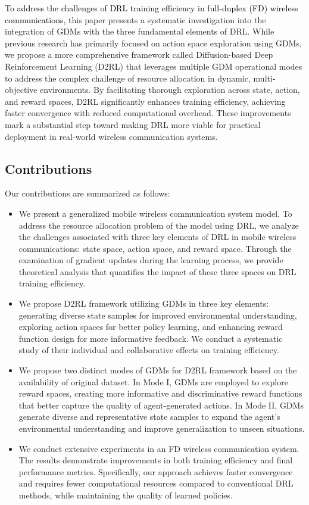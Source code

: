 \documentclass[comsoc,journal]{IEEEtran}
\begin{document}
\textcolor{black}{To address the challenges of DRL training efficiency in full-duplex (FD) wireless communications, }this paper presents a systematic investigation into the integration of GDMs with the three fundamental elements of DRL. While previous research has primarily focused on action space exploration using GDMs, we propose a more comprehensive framework called Diffusion-based Deep Reinforcement Learning (D2RL) that leverages multiple GDM operational modes to address the complex challenge of resource allocation in dynamic, multi-objective environments. By facilitating thorough exploration across state, action, and reward spaces, D2RL significantly enhances training efficiency, achieving faster convergence with reduced computational overhead. These improvements mark a substantial step toward making DRL more viable for practical deployment in real-world wireless communication systems.
\vspace{-8pt}
\subsection{Contributions}
Our contributions are summarized as follows:
\begin{itemize}
\item We present a generalized mobile wireless communication system model. To address the resource allocation problem of the model using DRL, we analyze the challenges associated with three key elements of DRL in mobile wireless communications: state space, action space, and reward space. Through the examination of gradient updates during the learning process, we provide theoretical analysis that quantifies the impact of these three spaces on DRL training efficiency.
\item  We propose D2RL framework utilizing GDMs in three key elements: generating diverse state samples for improved environmental understanding, exploring action spaces for better policy learning, and enhancing reward function design for more informative feedback. We conduct a systematic study of their individual and collaborative effects on training efficiency.
\item We propose two distinct modes of GDMs for D2RL framework based on the availability of original dataset. In Mode I, GDMs are employed to explore reward spaces, creating more informative and discriminative reward functions that better capture the quality of agent-generated actions. In Mode II, GDMs generate diverse and representative state samples to expand the agent's environmental understanding and improve generalization to unseen situations.
\item We conduct extensive experiments in an FD wireless communication system. The results demonstrate improvements in both training efficiency and final performance metrics. Specifically, our approach achieves faster convergence and requires fewer computational resources compared to conventional DRL methods, while maintaining the quality of learned policies.
\end{itemize}
\vspace{-8pt}
\end{document}
